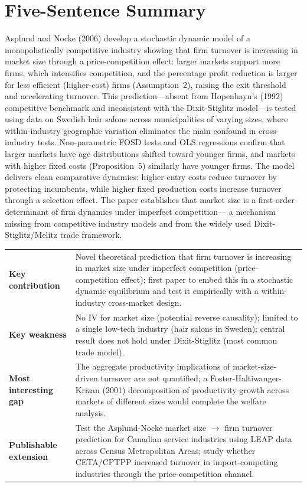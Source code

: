 \section*{Five-Sentence Summary}

Asplund and Nocke (2006) develop a stochastic dynamic model of a monopolistically
competitive industry showing that firm turnover is increasing in market size
through a price-competition effect: larger markets support more firms, which
intensifies competition, and the percentage profit reduction is larger for
less efficient (higher-cost) firms (Assumption~2), raising the exit threshold
and accelerating turnover. This prediction---absent from Hopenhayn's (1992)
competitive benchmark and inconsistent with the Dixit-Stiglitz model---is
tested using data on Swedish hair salons across municipalities of varying
sizes, where within-industry geographic variation eliminates the main confound
in cross-industry tests. Non-parametric FOSD tests and OLS regressions confirm
that larger markets have age distributions shifted toward younger firms, and
markets with higher fixed costs (Proposition~5) similarly have younger firms.
The model delivers clean comparative dynamics: higher entry costs reduce
turnover by protecting incumbents, while higher fixed production costs increase
turnover through a selection effect. The paper establishes that market size
is a first-order determinant of firm dynamics under imperfect competition---
a mechanism missing from competitive industry models and from the widely used
Dixit-Stiglitz/Melitz trade framework.

\vspace{6pt}
\begin{quickref}
\begin{tabularx}{\linewidth}{@{}lX@{}}
\textbf{Key contribution} &
  Novel theoretical prediction that firm turnover is increasing in market
  size under imperfect competition (price-competition effect); first paper
  to embed this in a stochastic dynamic equilibrium and test it empirically
  with a within-industry cross-market design. \\[4pt]
\textbf{Key weakness} &
  No IV for market size (potential reverse causality); limited to a single
  low-tech industry (hair salons in Sweden); central result does not hold
  under Dixit-Stiglitz (most common trade model). \\[4pt]
\textbf{Most interesting gap} &
  The aggregate productivity implications of market-size-driven turnover
  are not quantified; a Foster-Haltiwanger-Krizan (2001) decomposition of
  productivity growth across markets of different sizes would complete the
  welfare analysis. \\[4pt]
\textbf{Publishable extension} &
  Test the Asplund-Nocke market size $\to$ firm turnover prediction for
  Canadian service industries using LEAP data across Census Metropolitan
  Areas; study whether CETA/CPTPP increased turnover in import-competing
  industries through the price-competition channel.
\end{tabularx}
\end{quickref}
